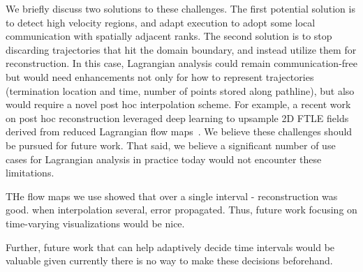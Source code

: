 We briefly discuss two solutions to these challenges.
%
The first potential solution is to detect high velocity regions, and adapt execution to adopt some local communication with spatially adjacent ranks.
%
%
%
The second solution is to stop discarding trajectories that hit the domain boundary, and instead utilize them for reconstruction. 
%
In this case, Lagrangian analysis could remain communication-free but would need enhancements not only for how to represent trajectories (termination location and time, number of points stored along pathline), but also would require a novel post hoc interpolation scheme.
%
For example, a recent work on post hoc reconstruction leveraged deep learning to upsample 2D FTLE fields derived from reduced Lagrangian flow maps~\cite{jakob2020fluid}.
%
%
%
We believe these challenges should be pursued for future work. 
%
That said, we believe a significant number of use cases for Lagrangian analysis in practice today would not encounter these limitations. 


THe flow maps we use showed that over a single interval - reconstruction was good. when interpolation several, error propagated. Thus, future work focusing on time-varying visualizations would be nice. 

Further, future work that can help adaptively decide time intervals would be valuable given currently there is no way to make these decisions beforehand. 
